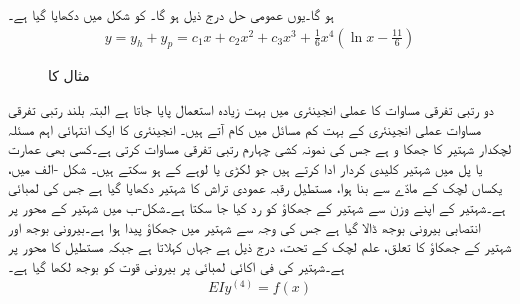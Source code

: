 ہو گا۔یوں عمومی حل درج ذیل ہو گا۔ کو شکل  میں دکھایا گیا ہے۔
\begin{align*}
y=y_h+y_p=c_1x+c_2x^2+c_3x^3+\frac{1}{6}x^4\left(\ln x-\frac{11}{6}\right)
\end{align*}
%
\begin{figure}
\centering
{}
\caption{مثال  کا }
\label{شکل_مثال_سادہ_بلند_یولر_کوشی_بدل}
\end{figure}

دو رتبی تفرقی مساوات کا عملی انجینئری میں بہت زیادہ استعمال پایا جاتا ہے البتہ بلند رتبی تفرقی مساوات عملی انجینئری کے بہت کم مسائل میں کام آتے ہیں۔ انجینئری کا ایک انتہائی اہم مسئلہ لچکدار شہتیر کا جھکا و ہے جس کی نمونہ کشی  چہارم رتبی تفرقی مساوات کرتی ہے۔کسی بھی عمارت یا پل میں شہتیر کلیدی کردار ادا کرتے ہیں جو لکڑی یا لوہے کے ہو سکتے ہیں۔
شکل -الف میں، یکساں لچک کے مادّے سے بنا ہوا، مستطیل رقبہ عمودی تراش کا شہتیر دکھایا گیا ہے جس کی لمبائی  ہے۔شہتیر کے اپنے وزن سے شہتیر کے جھکاؤ کو رد کیا جا سکتا ہے۔شکل-ب میں شہتیر کے محور  پر انتصابی بیرونی بوجھ  ڈالا گیا ہے جس کی وجہ سے شہتیر میں جھکاؤ پیدا ہوا ہے۔بیرونی بوجھ اور شہتیر کے جھکاؤ کا تعلق، علم لچک کے تحت، درج ذیل ہے  جہاں   کہلاتا ہے جبکہ  مستطیل کا محور  پر  ہے۔شہتیر کی فی اکائی لمبائی پر بیرونی قوت کو بوجھ  لکھا گیا ہے۔ 
\begin{align}\label{مساوات_سادہ_بلند_شہتیر_کا_جھکاو_الف}
EIy^{(4)}=f(x)
\end{align}


